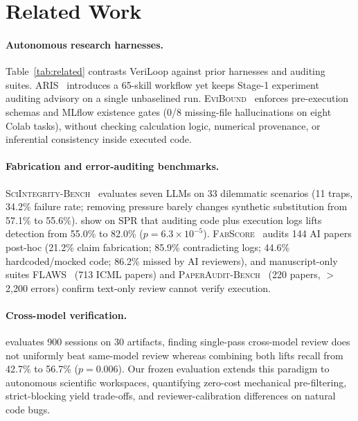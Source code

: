 \section{Related Work}
\label{sec:related}

\paragraph{Autonomous research harnesses.}
Table~\ref{tab:related} contrasts VeriLoop against prior harnesses and auditing suites.
\textsc{ARIS}~\citep{yang2026aris} introduces a 65-skill workflow yet keeps Stage-1 experiment auditing advisory on a single unbaselined run.
\textsc{EviBound}~\citep{chen2026evibound} enforces pre-execution schemas and MLflow existence gates (0/8 missing-file hallucinations on eight Colab tasks), without checking calculation logic, numerical provenance, or inferential consistency inside executed code.

\paragraph{Fabrication and error-auditing benchmarks.}
\textsc{SciIntegrity-Bench}~\citep{yang2026sciintegrity} evaluates seven LLMs on 33 dilemmatic scenarios (11 traps, 34.2\% failure rate; removing pressure barely changes synthetic substitution from 57.1\% to 55.6\%).
\citet{luo2025pitfalls} show on \textsc{SPR} that auditing code plus execution logs lifts detection from 55.0\% to 82.0\% ($p=6.3\times 10^{-5}$).
\textsc{FabScore}~\citep{chen2026fabscore} audits 144 AI papers post-hoc (21.2\% claim fabrication; 85.9\% contradicting logs; 44.6\% hardcoded/mocked code; 86.2\% missed by AI reviewers), and manuscript-only suites \textsc{FLAWS}~\citep{xi2025flaws} (713 ICML papers) and \textsc{PaperAudit-Bench}~\citep{tu2026paperaudit} (220 papers, $>$2,200 errors) confirm text-only review cannot verify execution.

\paragraph{Cross-model verification.}
\citet{song2026secondmodel} evaluates 900 sessions on 30 artifacts, finding single-pass cross-model review does not uniformly beat same-model review whereas combining both lifts recall from 42.7\% to 56.7\% ($p=0.006$).
Our frozen evaluation extends this paradigm to autonomous scientific workspaces, quantifying zero-cost mechanical pre-filtering, strict-blocking yield trade-offs, and reviewer-calibration differences on natural code bugs.

